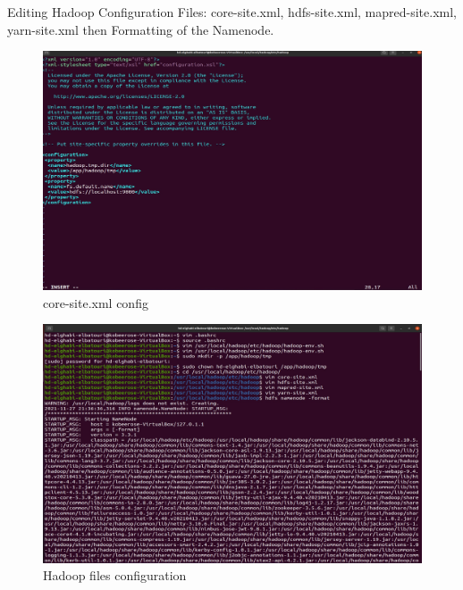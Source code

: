 \begin{spacing}{1.2}
\par Editing Hadoop Configuration Files: core-site.xml, hdfs-site.xml, mapred-site.xml, yarn-site.xml then Formatting of the Namenode. 
\\
\begin{figure}[!htb] 
\begin{center} 
\includegraphics[width=1\linewidth]{Big_Data/Hadoop/Apache Hadoop Installation/core-site.xml config} 
\end{center} 
\caption{core-site.xml config} 
\end{figure} 
\FloatBarrier
\begin{figure}[!htb] 
\begin{center} 
\includegraphics[width=1\linewidth]{Big_Data/Hadoop/Apache Hadoop Installation/Hadoop files configuration} 
\end{center} 
\caption{Hadoop files configuration} 
\end{figure} 
\FloatBarrier


\end{spacing}
